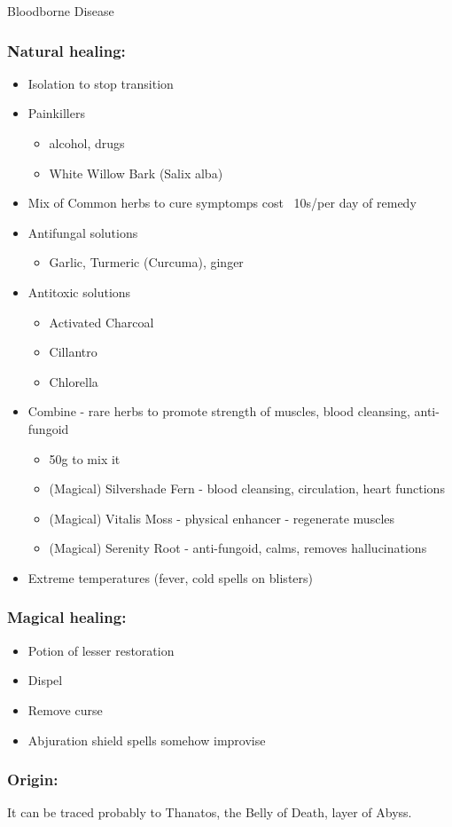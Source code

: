 \documentclass[10pt,onecolumn,twoside,openany,bg=full,layout=true]{dndbook}
\begin{document}
\begin{DndComment}{Bloodborne Disease}
\subsubsection*{Natural healing:}
\begin{itemize}
\item Isolation to stop transition
\item Painkillers
\begin{itemize}
  \item alcohol, drugs
\item White Willow Bark (Salix alba)
\end{itemize}
\item Mix of Common herbs to cure symptomps cost ~10s/per day of remedy
\item Antifungal solutions
\begin{itemize}
  \item Garlic, Turmeric (Curcuma), ginger
\end{itemize}
\item Antitoxic solutions
\begin{itemize}
\item Activated Charcoal
\item Cillantro
\item Chlorella
\end{itemize}
\item Combine - rare herbs to promote strength of muscles, blood cleansing, anti-fungoid
\begin{itemize}
\item 50g to mix it
\item (Magical) Silvershade Fern - blood cleansing, circulation, heart functions
\item (Magical) Vitalis Moss - physical enhancer - regenerate muscles
\item (Magical) Serenity Root - anti-fungoid, calms, removes hallucinations
\end{itemize}
\item Extreme temperatures (fever, cold spells on blisters)
\end{itemize}

\subsubsection*{Magical healing:}
\begin{itemize}
\item Potion of lesser restoration
\item Dispel
\item Remove curse
\item Abjuration shield spells somehow improvise
\end{itemize}

\subsubsection*{Origin:}
It can be traced probably to Thanatos, the Belly of Death, layer of Abyss.

\end{DndComment}
\end{document}
